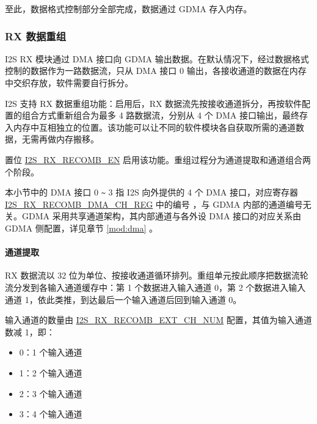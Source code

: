\documentclass[main\_\_CN.tex]{subfiles}
\begin{document}
至此，数据格式控制部分全部完成，数据通过 GDMA 存入内存。

\subsubsection{RX 数据重组} \label{sec:i2s-rx-recomb}

I2S RX 模块通过 DMA 接口向 GDMA 输出数据。在默认情况下，经过数据格式控制的数据作为一路数据流，只从 DMA 接口 0 输出，各接收通道的数据在内存中交织存放，软件需要自行拆分。

I2S 支持 RX 数据重组功能：启用后，RX 数据流先按接收通道拆分，再按软件配置的组合方式重新组合为最多 4 路数据流，分别从 4 个 DMA 接口输出，最终存入内存中互相独立的位置。该功能可以让不同的软件模块各自获取所需的通道数据，无需再做内存搬移。

置位 \hyperref[fielddesc:I2SRXRECOMBEN]{I2S\_RX\_RECOMB\_EN} 启用该功能。重组过程分为通道提取和通道组合两个阶段。

\begin{tiplisting}
本小节中的 DMA 接口 0 \verb+~+ 3 指 I2S 向外提供的 4 个 DMA 接口，对应寄存器 \hyperref[regdesc:I2SRXRECOMBDMACH0REG]{I2S\_RX\_RECOMB\_DMA\_CH\_REG} 中的编号 ，与 GDMA 内部的通道编号无关。GDMA 采用共享通道架构，其内部通道与各外设 DMA 接口的对应关系由 GDMA 侧配置，详见章节 \ref{mod:dma} \textit{}。
\end{tiplisting}

\paragraph{通道提取}

RX 数据流以 32 位为单位、按接收通道循环排列。重组单元按此顺序把数据流轮流分发到各输入通道缓存中：第 1 个数据进入输入通道 0，第 2 个数据进入输入通道 1，依此类推，到达最后一个输入通道后回到输入通道 0。

输入通道的数量由 \hyperref[fielddesc:I2SRXRECOMBEXTCHNUM]{I2S\_RX\_RECOMB\_EXT\_CH\_NUM} 配置，其值为输入通道数减 1，即：

\begin{itemize}
    \item 0：1 个输入通道
    \item 1：2 个输入通道
    \item 2：3 个输入通道
    \item 3：4 个输入通道
\end{itemize}
\end{document}
